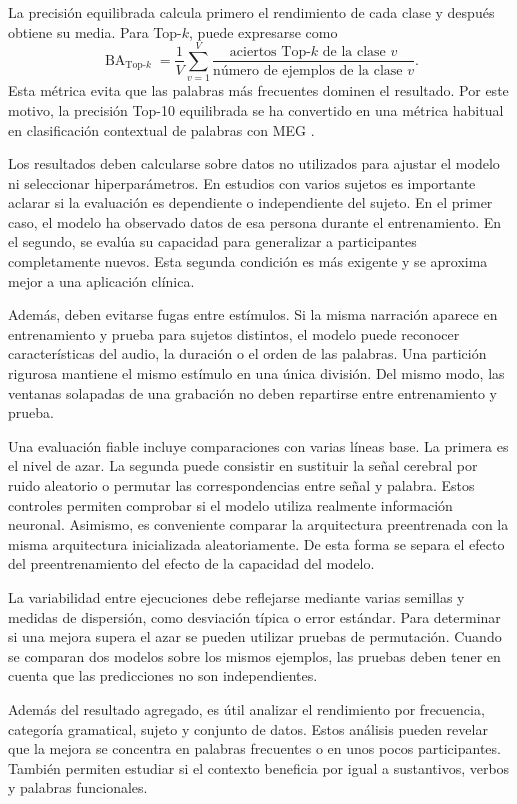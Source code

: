 La precisión equilibrada calcula primero el rendimiento de cada clase y después obtiene su media. Para Top-\(k\), puede expresarse como
\[
    \operatorname{BA}_{\text{Top-}k} =
    \frac{1}{V}
    \sum_{v=1}^{V}
    \frac{\text{aciertos Top-}k\text{ de la clase }v}
    {\text{número de ejemplos de la clase }v}.
\]
Esta métrica evita que las palabras más frecuentes dominen el resultado. Por este motivo, la precisión Top-10 equilibrada se ha convertido en una métrica habitual en clasificación contextual de palabras con MEG \cite{ozdogan2025libribrain,jayalath2026megxl}.

Los resultados deben calcularse sobre datos no utilizados para ajustar el modelo ni seleccionar hiperparámetros. En estudios con varios sujetos es importante aclarar si la evaluación es dependiente o independiente del sujeto. En el primer caso, el modelo ha observado datos de esa persona durante el entrenamiento. En el segundo, se evalúa su capacidad para generalizar a participantes completamente nuevos. Esta segunda condición es más exigente y se aproxima mejor a una aplicación clínica.

Además, deben evitarse fugas entre estímulos. Si la misma narración aparece en entrenamiento y prueba para sujetos distintos, el modelo puede reconocer características del audio, la duración o el orden de las palabras. Una partición rigurosa mantiene el mismo estímulo en una única división. Del mismo modo, las ventanas solapadas de una grabación no deben repartirse entre entrenamiento y prueba.

Una evaluación fiable incluye comparaciones con varias líneas base. La primera es el nivel de azar. La segunda puede consistir en sustituir la señal cerebral por ruido aleatorio o permutar las correspondencias entre señal y palabra. Estos controles permiten comprobar si el modelo utiliza realmente información neuronal. Asimismo, es conveniente comparar la arquitectura preentrenada con la misma arquitectura inicializada aleatoriamente. De esta forma se separa el efecto del preentrenamiento del efecto de la capacidad del modelo.

La variabilidad entre ejecuciones debe reflejarse mediante varias semillas y medidas de dispersión, como desviación típica o error estándar. Para determinar si una mejora supera el azar se pueden utilizar pruebas de permutación. Cuando se comparan dos modelos sobre los mismos ejemplos, las pruebas deben tener en cuenta que las predicciones no son independientes.

Además del resultado agregado, es útil analizar el rendimiento por frecuencia, categoría gramatical, sujeto y conjunto de datos. Estos análisis pueden revelar que la mejora se concentra en palabras frecuentes o en unos pocos participantes. También permiten estudiar si el contexto beneficia por igual a sustantivos, verbos y palabras funcionales.

